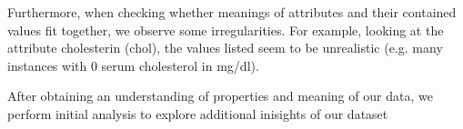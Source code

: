 Furthermore, when checking whether meanings of attributes and their contained values fit together, we observe some irregularities. For example, looking at the attribute cholesterin (chol), the values listed seem to be unrealistic (e.g. many instances with 0 serum cholesterol in mg/dl). 

After obtaining an understanding of properties and meaning of our data, we perform initial analysis to explore additional inisights of our dataset 


